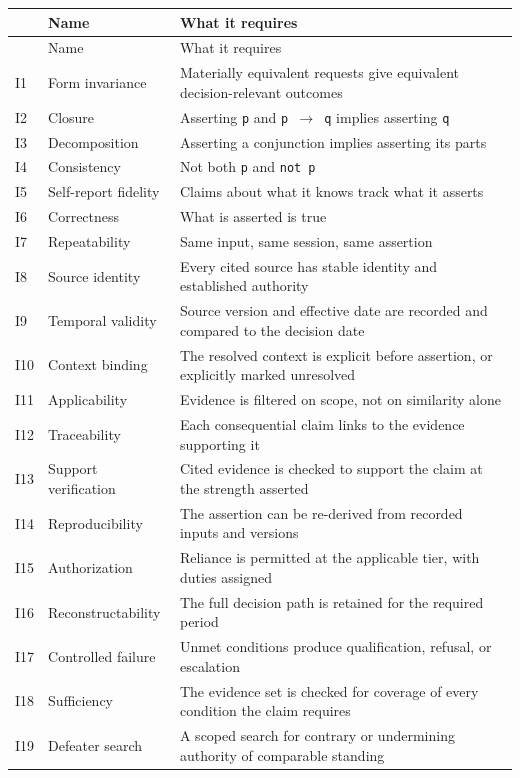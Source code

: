 \small
\begin{longtable}{@{}>{\raggedright\arraybackslash}p{1.12cm}>{\raggedright\arraybackslash}p{2.59cm}>{\raggedright\arraybackslash}p{10.63cm}@{}}
  \toprule
   & Name & What it requires \\
  \midrule
\endfirsthead
  \toprule
   & Name & What it requires \\
  \midrule
\endhead
  \bottomrule
\endlastfoot
  I1 & Form invariance & Materially equivalent requests give equivalent decision-relevant outcomes \\
  I2 & Closure & Asserting \texttt{p} and \texttt{p $\to$ q} implies asserting \texttt{q} \\
  I3 & Decomposition & Asserting a conjunction implies asserting its parts \\
  I4 & Consistency & Not both \texttt{p} and \texttt{not p} \\
  I5 & Self-report fidelity & Claims about what it knows track what it asserts \\
  I6 & Correctness & What is asserted is true \\
  I7 & Repeatability & Same input, same session, same assertion \\
  I8 & Source identity & Every cited source has stable identity and established authority \\
  I9 & Temporal validity & Source version and effective date are recorded and compared to the decision date \\
  I10 & Context binding & The resolved context is explicit before assertion, or explicitly marked unresolved \\
  I11 & Applicability & Evidence is filtered on scope, not on similarity alone \\
  I12 & Traceability & Each consequential claim links to the evidence supporting it \\
  I13 & Support verification & Cited evidence is checked to support the claim at the strength asserted \\
  I14 & Reproducibility & The assertion can be re-derived from recorded inputs and versions \\
  I15 & Authorization & Reliance is permitted at the applicable tier, with duties assigned \\
  I16 & Reconstructability & The full decision path is retained for the required period \\
  I17 & Controlled failure & Unmet conditions produce qualification, refusal, or escalation \\
  I18 & Sufficiency & The evidence set is checked for coverage of every condition the claim requires \\
  I19 & Defeater search & A scoped search for contrary or undermining authority of comparable standing \\
\end{longtable}
\normalsize


